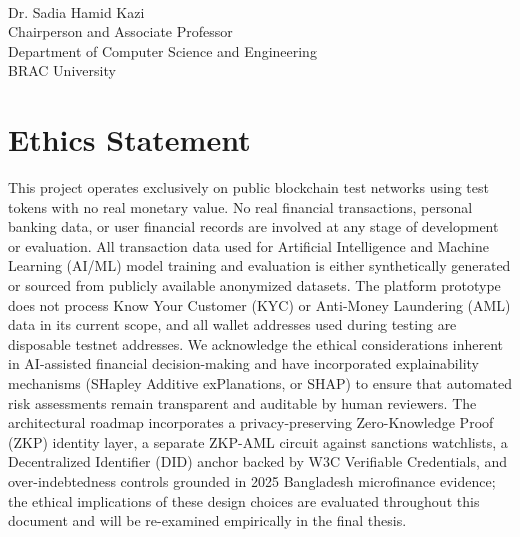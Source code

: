 \documentclass[12pt,a4paper]{report}
\begin{document}
\begin{flushright}
\vspace{-0.5cm}
\hrulefill\\
Dr. Sadia Hamid Kazi\\
Chairperson and Associate Professor\\
Department of Computer Science and Engineering\\
BRAC University
\end{flushright}

\newpage
\thispagestyle{empty}

\chapter*{Ethics Statement}
{}

This project operates exclusively on public blockchain test networks using test tokens with no real monetary value. No real financial transactions, personal banking data, or user financial records are involved at any stage of development or evaluation. All transaction data used for Artificial Intelligence and Machine Learning (AI/ML) model training and evaluation is either synthetically generated or sourced from publicly available anonymized datasets. The platform prototype does not process Know Your Customer (KYC) or Anti-Money Laundering (AML) data in its current scope, and all wallet addresses used during testing are disposable testnet addresses. We acknowledge the ethical considerations inherent in AI-assisted financial decision-making and have incorporated explainability mechanisms (SHapley Additive exPlanations, or SHAP) to ensure that automated risk assessments remain transparent and auditable by human reviewers. The architectural roadmap incorporates a privacy-preserving Zero-Knowledge Proof (ZKP) identity layer, a separate ZKP-AML circuit against sanctions watchlists, a Decentralized Identifier (DID) anchor backed by W3C Verifiable Credentials, and over-indebtedness controls grounded in 2025 Bangladesh microfinance evidence; the ethical implications of these design choices are evaluated throughout this document and will be re-examined empirically in the final thesis.

\newpage
\thispagestyle{empty}
\end{document}
